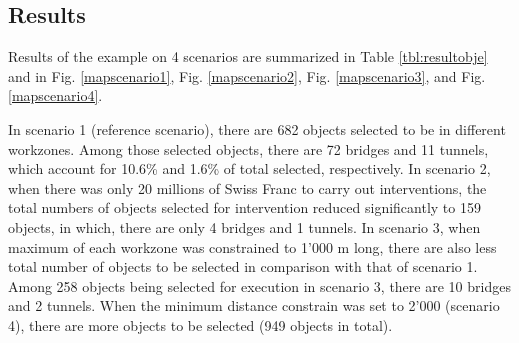 \documentclass[a4paper,3p,times,authoryear]{elsarticle}
\begin{document}
\subsection{Results}
Results of the example on 4 scenarios are summarized in Table \ref{tbl:resultobje} and in Fig. \ref{mapscenario1}, Fig. \ref{mapscenario2}, Fig. \ref{mapscenario3}, and Fig. \ref{mapscenario4}. 

In scenario 1 (reference scenario), there are 682 objects selected to be in different workzones. Among those selected objects, there are 72 bridges and 11 tunnels, which account for 10.6\% and 1.6\% of total selected, respectively. In scenario 2, when there was only 20 millions of Swiss Franc to carry out interventions, the total numbers of objects selected for intervention reduced significantly to 159 objects, in which, there are only 4 bridges and 1 tunnels. In scenario 3, when maximum  of each workzone was constrained to 1'000 m long, there are also less total number of objects to be selected in comparison with that of scenario 1. Among 258 objects being selected for execution in scenario 3, there are 10 bridges and 2 tunnels. When the minimum distance constrain was set to 2'000 (scenario 4), there are more objects to be selected (949 objects in total).
\end{document}
